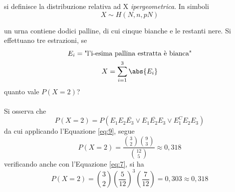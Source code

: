 \documentclass{subfiles}
\begin{document}
\begin{Definition*}
    si definisce la distribuzione relativa ad X \emph{ipergeometrica}. In simboli
    \[
        X \sim H(N, n, pN)
    \]
\end{Definition*}

\begin{Example*}
    un urna contiene dodici palline, di cui cinque bianche e le restanti nere. Si effettuano tre estrazioni, se
    \[\begin{gathered}
            E_{i} = \text{"l'i-esima pallina estratta è bianca"} \\
            X = \sum\limits_{i = 1}^{3}{\abs{E_{i}}}
        \end{gathered}\]
    quanto vale \(P(X = 2)\)?
    \\ \\
    Si osserva che
    \[
        P(X = 2) = P(E_{1}E_{2}\overline{E_{3}} \lor E_{1}\overline{E_{2}}E_{3} \lor E_{1}^{C}E_{2}E_{3})
    \]
    da cui applicando l'Equazione \eqref{eq:9}, segue
    \[
        P(X = 2) = \frac{\binom{3}{2}\binom{9}{3}}{\binom{12}{5}} \approx 0,318
    \]
    verificando anche con l'Equazione \eqref{eq:7}, si ha
    \[
        P(X = 2) = \binom{3}{2}\left(\frac{5}{12}\right)^{3}\left(\frac{7}{12}\right) = 0,303 \approx 0,318
    \]
\end{Example*}
\end{document}
